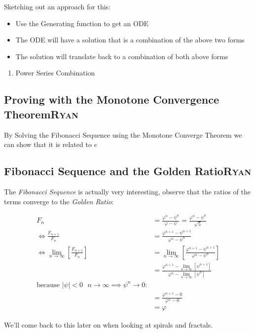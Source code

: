 \documentclass[a4paper,11pt,twoside]{article}
\begin{document}
Sketching out an approach for this:

\begin{itemize}
\item Use the Generating function to get an ODE
\item The ODE will have a solution that is a combination of the above two forms
\item The solution will translate back to a combination of both above forms
\end{itemize}
\begin{enumerate}
\item Power Series Combination
\label{power-series-comb}
\end{enumerate}
\subsection{Proving with the Monotone Convergence Theorem\hfill{}\textsc{Ryan}}
\label{sec:orgcca13a7}
By Solving the Fibonacci Sequence using the Monotone Converge Theorem we can show that it is related to \(e\)
\subsection{Fibonacci Sequence and the Golden Ratio\hfill{}\textsc{Ryan}}
\label{fib-golden-ratio-proof}
The \emph{Fibonacci Sequence} is actually very interesting, observe that the ratios of the terms converge to the \emph{Golden Ratio}:

\begin{align*}
    F_n &= \frac{\varphi^n-\psi^n}{\varphi-\psi} = \frac{\varphi^n-\psi^n}{\sqrt 5} \\
    \iff \frac{F_{n+1}}{F_n}	&= \frac{\varphi^{n+ 1} - \psi^{n+  1}}{\varphi^{n} - \psi^{n}} \\
    \iff \lim_{n \rightarrow \infty}\left[ \frac{F_{n+1}}{F_n} \right]	&= \lim_{n \rightarrow \infty}\left[ \frac{\varphi^{n+ 1} - \psi^{n+  1}}{\varphi^{n} - \psi^{n}} \right] \\
&= \frac{\varphi^{n+ 1} -\lim_{n \rightarrow \infty}\left[ \psi^{n +  1} \right] }{\varphi^{n} - \lim_{n \rightarrow \infty}\left[ \psi^n \right] } \\
\text{because $\mid \psi \mid < 0$ $n \rightarrow \infty \implies \psi^{n} \rightarrow 0$:} \\
&= \frac{\varphi^{n+  1} -  0}{\varphi^{n} -  0} \\
&= \varphi
\end{align*}

We'll come back to this later on when looking at spirals and fractals.
\end{document}
